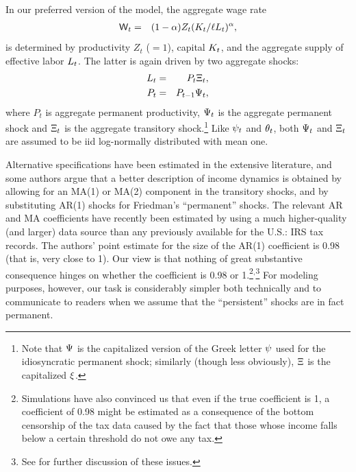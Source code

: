 \documentclass[12pt,titlepage]{econtex}
\renewcommand{\ptyLev}{\ensuremath{Z}} %
\begin{document}
In our preferred version of the model, the aggregate wage rate
\begin{eqnarray}
\Wage_{t} &=&(1-\kapShare)\ptyLev_{t}(\KLev_{t}/\labor\LLev_{t})^{\kapShare},  \label{eq:wagerate}
\end{eqnarray}
is determined by productivity $\ptyLev_{t}$ ($=1$), capital $K_{t}$, and the aggregate supply of effective labor $L_{t}$. The latter is again driven by two aggregate shocks:
\begin{eqnarray}
  L_{t}&=&P_{t} \Xi_{t}, \label{eq:aggrTemp}\\
  P_{t}&=&P_{t-1} \Psi_{t}, \label{eq:aggrPerm}
\end{eqnarray}
where $P_{t}$ is aggregate permanent productivity, $\Psi_{t}$ is the aggregate permanent shock and $\Xi_{t}$ is the aggregate transitory shock.\footnote{Note that $\Psi$ is the capitalized
version of the Greek letter $\psi$ used for the idiosyncratic
permanent shock; similarly (though less obviously), $\Xi$ is the
capitalized $\xi$.}
Like $\psi_{t}$ and $\theta_{t}$, both $\Psi_{t}$ and $\Xi_{t}$ are assumed to
be iid log-normally distributed with mean one.

Alternative specifications have been estimated in the extensive
literature, and some authors argue that a better description of income
dynamics is obtained by allowing for an MA(1) or MA(2) component in
the transitory shocks, and by substituting AR(1) shocks for Friedman's
``permanent'' shocks.  The relevant AR and MA coefficients have
recently been estimated by \cite{dhprvInequality} using a much higher-quality
(and larger) data source than any previously available for the U.S.:
IRS tax records.  The authors' point estimate for the size of the
AR(1) coefficient is 0.98 (that is, very close to 1).  Our view is that nothing
of great substantive consequence hinges on whether the coefficient is 0.98 or 1.\footnote{%
Simulations have also convinced us that even if the true coefficient is 1, a coefficient of 0.98
might be estimated as a consequence of the bottom censorship of the tax data caused by the
fact that those whose income falls below a certain threshold do not owe any tax.}$^{,}$\footnote{See \cite{cstKS} for further discussion of these issues.}
For modeling purposes, however, our task is considerably simpler both
technically and to communicate to readers when we assume that the
``persistent'' shocks are in fact permanent.

\end{document}
